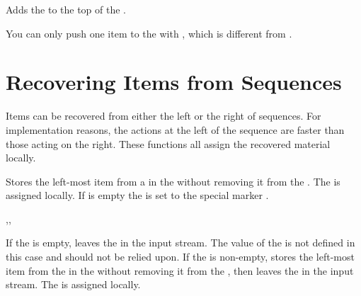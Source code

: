 \documentclass[oneside]{book}
\begin{document}
\begin{function}{\seqPush}
\begin{syntax}
  
\end{syntax}
Adds the  to the top of the .
\begin{demohigh}
\seqSetFromClist {}
\seqPush {}
\seqVarJoin \lTmpaSeq {|}
\end{demohigh}
You can only push one item to the  with ,
which is different from .
\end{function}

\section{Recovering Items from Sequences}

Items can be recovered from either the left or the right of sequences.
For implementation reasons, the actions at the left of the sequence are
faster than those acting on the right. These functions all assign the
recovered material locally.

\begin{function}{\seqGetLeft}
\begin{syntax}
  
\end{syntax}
Stores the left-most item from a  in the
 without removing it from the
. The  is assigned locally.
If  is empty the 
is set to the special marker .
\begin{demohigh}
\seqSetFromClist {}
\seqGetLeft \lTmpaSeq \lTmpaTl
\tlUse \lTmpaTl
\end{demohigh}
\end{function}

\begin{function}{\seqGetLeftT,\seqGetLeftF,\seqGetLeftTF}
\begin{syntax}
   
   
    
\end{syntax}
If the  is empty, leaves the  in the
input stream.  The value of the  is
not defined in this case and should not be relied upon.  If the
 is non-empty, stores the left-most item from the
in the  without removing it from the
, then leaves the  in the input stream.
The  is assigned locally.
\begin{demohigh}
\seqSetFromClist {}
\seqGetLeftTF \lTmpaSeq {} {}
\end{demohigh}
\end{function}
\end{document}
